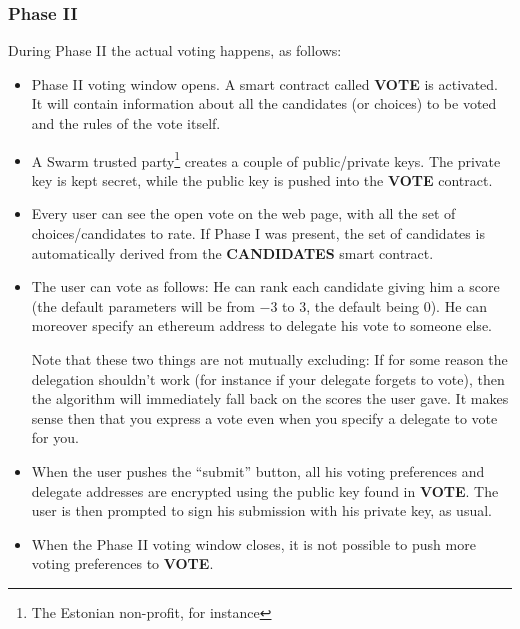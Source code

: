 \documentclass[submission, copyright,creativecommons,sharealike,noncommercial]{eptcs}
\newcommand{\Candidates}{\textbf{CANDIDATES}\xspace}
\newcommand{\Vote}{\textbf{VOTE}\xspace}
\begin{document}
\subsubsection{Phase II}\label{subsubsec:Intuitive Phase II}
%
	During Phase II the actual voting happens, as follows:
	\begin{itemize}
		\item Phase II voting window opens. A smart contract called \Vote is activated. It will contain information about all the candidates (or choices) to be voted and the rules of the vote itself.
		\item A Swarm trusted party\footnote{The Estonian non-profit, for instance} creates a couple of public/private keys. The private key is kept secret, while the public key is pushed into the \Vote contract.
		\item Every user can see the open vote on the web page, with all the set of choices/candidates to rate. If Phase I was present, the set of candidates is automatically derived from the \Candidates smart contract. 
		\item The user can vote as follows: He can rank each candidate giving him a score (the default parameters will be from $-3$ to $3$, the default being $0$). He can moreover specify an ethereum address to delegate his vote to someone else. 
		
		Note that these two things are not mutually excluding: If for some reason the delegation shouldn't work (for instance if your delegate forgets to vote), then the algorithm will immediately fall back on the scores the user gave. It makes sense then that you express a vote even when you specify a delegate to vote for you.
		\item When the user pushes the ``submit'' button, all his voting preferences and delegate addresses are encrypted using the public key found in \Vote. The user is then prompted to sign his submission with his private key, as usual.
		\item When the Phase II voting window closes, it is not possible to push more voting preferences to \Vote.
	\end{itemize}
%
%
\end{document}
